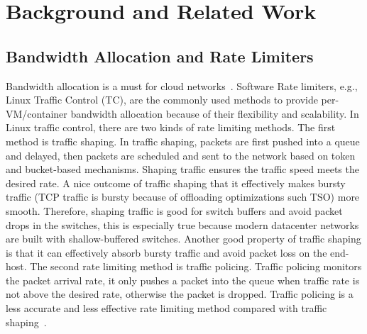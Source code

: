 \section{Background and Related Work}
\label{rate-limiter:sec:background}


\subsection{Bandwidth Allocation and Rate Limiters}
\label{sec:bandwidth-allocation-in-clouds}
Bandwidth allocation is a must for cloud networks~\cite{shieh2011sharing,jeyakumar2013eyeq,rodrigues2011gatekeeper}. 
Software Rate limiters, e.g., Linux Traffic Control (TC), are the commonly used methods
to provide per-VM/container bandwidth allocation because of their flexibility and scalability.
In Linux traffic control, there are two kinds of rate limiting methods.
The first method is traffic shaping. In traffic shaping, packets are first pushed into a queue and delayed,
then packets are scheduled and sent to the network based on token and bucket-based mechanisms.
Shaping traffic ensures the traffic speed meets the desired rate.
A nice outcome of traffic shaping that it effectively makes bursty traffic
(TCP traffic is bursty because of offloading optimizations such TSO) more smooth.
Therefore, shaping traffic is good for switch buffers and avoid packet drops in the switches,
this is especially true because modern datacenter networks are built with shallow-buffered switches.
Another good property of traffic shaping is that it can effectively absorb bursty traffic and avoid
packet loss on the end-host.
The second rate limiting method is traffic policing. Traffic policing monitors the packet arrival rate,
it only pushes a packet into the queue when traffic rate is not above the desired rate,
otherwise the packet is dropped. Traffic policing is a less accurate and less effective
rate limiting method compared with traffic shaping~\cite{ovs-qos}.

